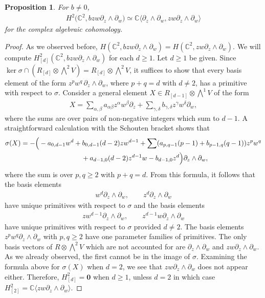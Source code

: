 \documentclass[pdftex]{sigma}
\numberwithin{equation}{section}
\newtheorem{Proposition}[Theorem]{Proposition}
 { \theoremstyle{definition}
\newtheorem{Definition}[Theorem]{Definition}
\newtheorem{Note}[Theorem]{Note}
\newtheorem{Example}[Theorem]{Example}
\newtheorem{Remark}[Theorem]{Remark} }
\begin{document}
\begin{Proposition}
For $b\not=0$,
\begin{gather*}
H^2\big({\mathbb C}^2,bzw\partial_z\wedge\partial_w\big)\simeq {\mathbb C}\langle \partial_z\wedge\partial_w,zw\partial_z\wedge\partial_w\rangle
\end{gather*}
for the complex algebraic cohomology.
\end{Proposition}
\begin{proof} As we observed before, $H({\mathbb C}^2,bzw\partial_z\wedge\partial_w)=H({\mathbb C}^2,zw\partial_z\wedge\partial_w)$. We will compute $H^2_{[d]}({\mathbb C}^2,bzw\partial_z\wedge\partial_w)$ for each $d\ge 1$. Let $d\ge 1$ be given. Since $\ker\sigma\cap (R_{[d]}\otimes \bigwedge^2 V)=R_{[d]}\otimes \bigwedge^2 V$, it suf\/f\/ices to show that every basis element of the form $z^pw^q\,\partial_z\wedge\partial_w$, where $p+q=d$ with $d\not=2$, has a primitive with respect to $\sigma$. Consider a general element $X\in R_{[d-1]}\otimes \bigwedge^1 V$ of the form
\begin{gather*}
X=\sum_{\alpha,\beta}a_{\alpha\beta}z^\alpha w^\beta\partial_z+\sum_{\gamma,\delta} b_{\gamma,\delta}z^\gamma w^\delta \partial_w,
\end{gather*}
where the sums are over pairs of non-negative integers which sum to $d-1$. A straightforward calculation with the Schouten bracket shows that
\begin{gather*}
\sigma(X) =  -\Big({}-a_{0,d-1}w^d+b_{0,d-1}(d-2)zw^{d-1}    +\sum (a_{p,q-1}(p-1)+b_{p-1,q}(q-1))z^pw^q   \\
 \hphantom{\sigma(X) =}{} +  a_{d-1,0}(d-2)z^{d-1}w-b_{d-1,0}z^d\Big)\partial_z\wedge\partial_w, %
\end{gather*}
where the sum is over $p,q\ge 2$ with $p+q=d$. From this formula, it follows that the basis elements
\begin{gather*}
w^d\partial_z\wedge\partial_w,\qquad z^d\partial_z\wedge\partial_w
\end{gather*}
have unique primitives with respect to $\sigma$ and the basis elements
\begin{gather*}
zw^{d-1}\partial_z\wedge\partial_w,\qquad z^{d-1}w\partial_z\wedge\partial_w
\end{gather*}
have unique primitives with respect to $\sigma$ provided $d\not= 2$. The basis elements $z^pw^q\partial_z\wedge\partial_w$ with $p,q\ge 2$ have one parameter families of primitives. The only basis vectors of $R\otimes \bigwedge^2 V$ which are not accounted for are $\partial_z\wedge\partial_w$ and $zw\partial_z\wedge\partial_w$. As we already observed, the f\/irst cannot be in the image of $\sigma$. Examining the formula above for $\sigma(X)$ when $d=2$, we see that $zw\partial_z\wedge\partial_w$ does not appear either. Therefore, $H_{[d]}^2=\mathbf 0$ when $d\ge 1$, unless $d=2$ in which case $H_{[2]}^2={\mathbb C}\langle zw\partial_z\wedge\partial_w\rangle$.
\end{proof}
\end{document}
